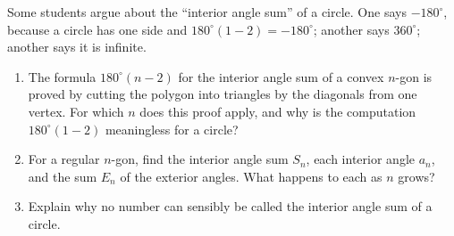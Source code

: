 Some students argue about the ``interior angle sum'' of a circle. One says $-180^\circ$, because a circle has one side and $180^\circ(1-2)=-180^\circ$; another says $360^\circ$; another says it is infinite.
\begin{enumerate}
\item[(a)] The formula $180^\circ(n-2)$ for the interior angle sum of a convex $n$-gon is proved by cutting the polygon into triangles by the diagonals from one vertex. For which $n$ does this proof apply, and why is the computation $180^\circ(1-2)$ meaningless for a circle?
\item[(b)] For a regular $n$-gon, find the interior angle sum $S_n$, each interior angle $a_n$, and the sum $E_n$ of the exterior angles. What happens to each as $n$ grows?
\item[(c)] Explain why no number can sensibly be called the interior angle sum of a circle.
\end{enumerate}
